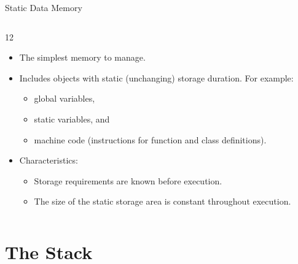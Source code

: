 \documentclass[14pt,aspectratio=1610]{beamer}
\begin{document}
\begin{frame}{Static Data Memory}
\begin{columns}
\begin{overlayarea}{\linewidth}{12\baselineskip}
  \begin{itemize}
  \item<+->
    The simplest memory to manage.
  \item<+->
    Includes objects with static (unchanging) storage duration. For example:
    \begin{itemize}
      \item
        global variables,
      \item
        static variables, and
      \item
        machine code (instructions for function and class definitions).
    \end{itemize}
  \item<+->
    Characteristics:

    \begin{itemize}
    \item
      Storage requirements are known before execution.
    \item
      The size of the static storage area is constant throughout execution.
    \end{itemize}
  \end{itemize}
\end{overlayarea}
  \vspace{1.5em}
  
\end{columns}
\end{frame}

\section{The Stack}
\end{document}

